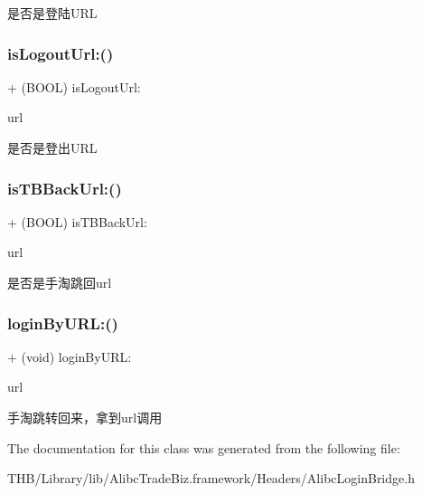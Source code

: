 是否是登陆\+U\+RL \mbox{\label{interface_alibc_login_bridge_a6c71429da4ac9d97e103a8bb5a6141d6}} 
\subsubsection{\texorpdfstring{is\+Logout\+Url\+:()}{isLogoutUrl:()}}
{\footnotesize\ttfamily + (B\+O\+OL) is\+Logout\+Url\+: \begin{DoxyParamCaption}\item[{(N\+S\+String $\ast$)}]{url }\end{DoxyParamCaption}}

是否是登出\+U\+RL \mbox{\label{interface_alibc_login_bridge_ad5d29a3e5ba45d759cfced3335baea4d}} 
\subsubsection{\texorpdfstring{is\+T\+B\+Back\+Url\+:()}{isTBBackUrl:()}}
{\footnotesize\ttfamily + (B\+O\+OL) is\+T\+B\+Back\+Url\+: \begin{DoxyParamCaption}\item[{(N\+S\+String $\ast$)}]{url }\end{DoxyParamCaption}}

是否是手淘跳回url \mbox{\label{interface_alibc_login_bridge_a16999b3633620cdfecec73604996c179}} 
\subsubsection{\texorpdfstring{login\+By\+U\+R\+L\+:()}{loginByURL:()}}
{\footnotesize\ttfamily + (void) login\+By\+U\+R\+L\+: \begin{DoxyParamCaption}\item[{(N\+S\+U\+RL $\ast$)}]{url }\end{DoxyParamCaption}}

手淘跳转回来，拿到url调用 

The documentation for this class was generated from the following file\+:\begin{DoxyCompactItemize}
\item 
T\+H\+B/\+Library/lib/\+Alibc\+Trade\+Biz.\+framework/\+Headers/Alibc\+Login\+Bridge.\+h\end{DoxyCompactItemize}

